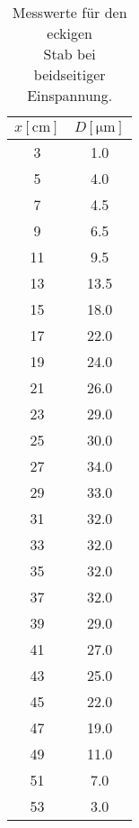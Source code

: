 \begin{table}
    \begin{minipage}{0.48\linewidth}
        \centering
        \caption{Messwerte für den runden \\Stab bei beidseitiger Einspannung.\cite{V103}}
        \label{tab:Beidseitige_Einspannung_rund}
        \begin{tabular}[h!]{|c|c|}
            \toprule
            {$x\left[\unit{\centi\meter}\right]$} & {$D\left[\unit{\micro\meter}\right]$}\\
            \midrule
            3& 1.0\\
            5& 4.0\\
            7& 4.5\\
            9& 6.5\\
            11& 9.5\\
            13& 13.5\\
            15& 18.0\\
            17& 22.0\\
            19& 24.0\\
            21& 26.0\\
            23& 29.0\\
            25& 30.0\\
            \hline
            27& 34.0\\
            29& 33.0\\
            31& 32.0\\
            33& 32.0\\
            35& 32.0\\
            37& 32.0\\
            39& 29.0\\
            41& 27.0\\
            43& 25.0\\
            45& 22.0\\
            47& 19.0\\
            49& 11.0\\
            51& 7.0\\
            53& 3.0\\
            \bottomrule
        \end{tabular}
    \end{minipage}
    \begin{minipage}{0.48\linewidth}
        \centering
        \caption{Messwerte für den eckigen \\Stab bei beidseitiger Einspannung.\cite{V103}}
        \label{tab:Beidseitige_Einspannung_eckig}

\end{minipage}
\end{table}
